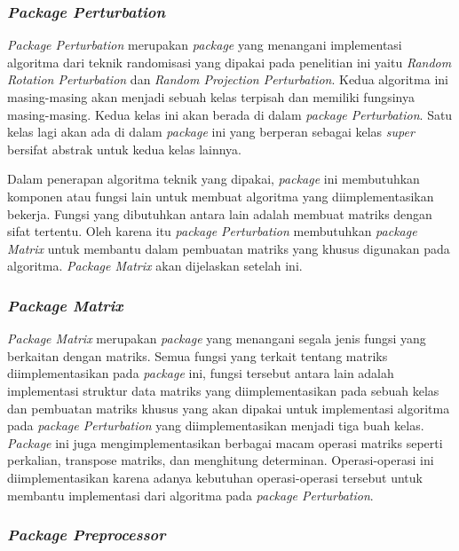 \subsubsection{\textit{Package Perturbation}}
\label{subsubsec:package-perturbation}

\textit{Package Perturbation} merupakan \textit{package} yang menangani implementasi algoritma dari teknik randomisasi yang dipakai pada penelitian ini yaitu \textit{Random Rotation Perturbation} dan \textit{Random Projection Perturbation}. Kedua algoritma ini masing-masing akan menjadi sebuah kelas terpisah dan memiliki fungsinya masing-masing. Kedua kelas ini akan berada di dalam \textit{package Perturbation}. Satu kelas lagi akan ada di dalam \textit{package} ini yang berperan sebagai kelas \textit{super} bersifat abstrak untuk kedua kelas lainnya.

Dalam penerapan algoritma teknik yang dipakai, \textit{package} ini membutuhkan komponen atau fungsi lain untuk membuat algoritma yang diimplementasikan bekerja. Fungsi yang dibutuhkan antara lain adalah membuat matriks dengan sifat tertentu. Oleh karena itu \textit{package Perturbation} membutuhkan \textit{package Matrix} untuk membantu dalam pembuatan matriks yang khusus digunakan pada algoritma. \textit{Package Matrix} akan dijelaskan setelah ini.

\subsubsection{\textit{Package Matrix}}
\label{subsubsec:package-matrix}

\textit{Package Matrix} merupakan \textit{package} yang menangani segala jenis fungsi yang berkaitan dengan matriks. Semua fungsi yang terkait tentang matriks diimplementasikan pada \textit{package} ini, fungsi tersebut antara lain adalah implementasi struktur data matriks yang diimplementasikan pada sebuah kelas dan pembuatan matriks khusus yang akan dipakai untuk implementasi algoritma pada \textit{package Perturbation} yang diimplementasikan menjadi tiga buah kelas. \textit{Package} ini juga mengimplementasikan berbagai macam operasi matriks seperti perkalian, transpose matriks, dan menghitung determinan. Operasi-operasi ini diimplementasikan karena adanya kebutuhan operasi-operasi tersebut untuk membantu implementasi dari algoritma pada \textit{package Perturbation}.

\subsubsection{\textit{Package Preprocessor}}
\label{subsubsec:package-preprocessor}

